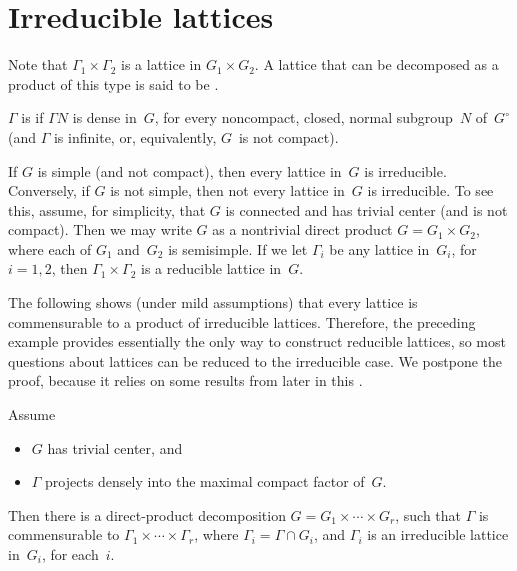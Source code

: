 \section{Irreducible lattices} \label{IrredLattSect}

Note that $\Gamma_1 \times \Gamma_2$ is a lattice in $G_1
\times G_2$. A lattice that can be decomposed as a product
of this type is said to be .

\begin{defn} \label{irreducibleLattice}
 $\Gamma$ is  if $\Gamma N$ is dense
in~$G$, for every noncompact, closed, normal subgroup~$N$
of~$G^\circ$ (and $\Gamma$ is infinite, or, equivalently, $G$~is not compact).
 \end{defn}

\begin{eg}
If $G$ is simple (and not compact), then
every lattice in~$G$ is irreducible.  Conversely, if $G$
is not simple, then not every lattice
in~$G$ is irreducible.  To see this, assume, for
simplicity, that $G$ is connected and has trivial center (and is not compact). Then we may write
$G$ as a nontrivial direct product $G = G_1 \times G_2$,
where each of $G_1$ and~$G_2$ is semisimple. If we let
$\Gamma_i$ be any lattice in~$G_i$, for $i = 1,2$, then
$\Gamma_1 \times \Gamma_2$ is a reducible lattice in~$G$.
\end{eg}

The following  shows (under mild assumptions)
that every lattice is commensurable to a product of irreducible
lattices. Therefore, the preceding example provides essentially
the only way to construct reducible lattices, so most
questions about lattices can be reduced to the irreducible
case. We postpone the proof, because
it relies on some results from later in this .

\begin{prop} \label{prodirredlatt}
 Assume 
 \noprelistbreak
 \begin{itemize}
 \item $G$ has trivial center,
  and 
 \item $\Gamma$ projects densely into the maximal compact
factor of~$G$. 
 \end{itemize}
 Then there is a direct-product decomposition $G = G_1 \times
\cdots \times G_r$, such that $\Gamma$ is commensurable
to\/ $\Gamma_1 \times \cdots \times \Gamma_r$, where\/
$\Gamma_i = \Gamma \cap G_i$, and\/ $\Gamma_i$ is an
irreducible lattice in~$G_i$, for each~$i$.
 \end{prop}

